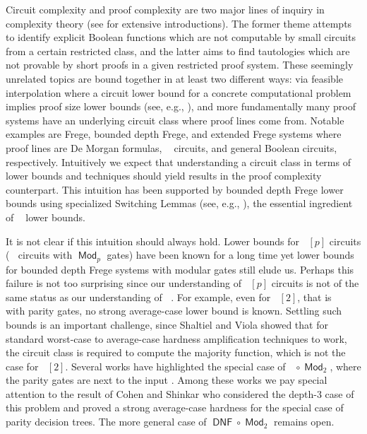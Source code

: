 \documentclass[10pt,a4paper]{article}
\theoremstyle{definition}
\theoremstyle{remark}
\DeclareMathOperator{\ACzero}{\mathsf{AC}^0}
\DeclareMathOperator{\dnf}{\mathsf{DNF}}
\DeclareMathOperator{\Mod}{\mathsf{Mod}}
\DeclareMathOperator{\reslin}{\mathsf{Res}[\oplus]}
\begin{document}
Circuit complexity and proof complexity are two major lines of inquiry in complexity theory (see \cite{DBLP:books/daglib/0028687, kraj_2019} for extensive introductions). The former theme attempts to identify explicit Boolean functions which are not computable by small circuits from a certain restricted class, and the latter aims to find tautologies which are not provable by short proofs in a given restricted proof system. These seemingly unrelated topics are bound together in at least two different ways: via feasible interpolation where a circuit lower bound for a concrete computational problem implies proof size lower bounds (see, e.g., \cite{DBLP:conf/focs/HrubesP17}), and more fundamentally many proof systems have an underlying circuit class where proof lines come from. Notable examples are Frege, bounded depth Frege, and extended Frege systems where proof lines are De Morgan formulas, $\ACzero$ circuits, and general Boolean circuits, respectively. Intuitively we expect that understanding a circuit class in terms of lower bounds and techniques should yield results in the proof complexity counterpart. This intuition has been supported by bounded depth Frege lower bounds using specialized Switching Lemmas (see, e.g., \cite{DBLP:journals/jacm/Hastad21}), the essential ingredient of $\ACzero$ lower bounds.

\bigskip
\noindent{\bf $\ACzero[2]$ circuits and $\reslin$ proof system.} It is not clear if this intuition should always hold. Lower bounds for $\ACzero[p]$ circuits ($\ACzero$ circuits with $\Mod_p$ gates) have been known for a long time \cite{MR897705,DBLP:conf/stoc/Smolensky87} yet lower bounds for bounded depth Frege systems with modular gates still elude us. Perhaps this failure is not too surprising since our understanding of $\ACzero[p]$ circuits is not of the same status as our understanding of $\ACzero$. For example, even for $\ACzero[2]$, that is $\ACzero$ with parity gates, no strong average-case lower bound is known. Settling such bounds is an important challenge, since Shaltiel and Viola \cite{DBLP:journals/siamcomp/ShaltielV10} showed that for standard worst-case to average-case hardness amplification techniques to work, the circuit class is required to compute the majority function, which is not the case for $\ACzero[2]$. Several works have highlighted the special case of $\ACzero\circ \Mod_2$, where the parity gates are next to the input \cite{DBLP:journals/eccc/ServedioV12,DBLP:conf/innovations/AkaviaBGKR14,DBLP:conf/innovations/CohenS16}. Among these works we pay special attention to the result of Cohen and Shinkar \cite{DBLP:conf/innovations/CohenS16} who considered the depth-3 case of this problem and proved a strong average-case hardness for the special case of parity decision trees. The more general case of $\dnf \circ \Mod_2$ remains open.
\end{document}
